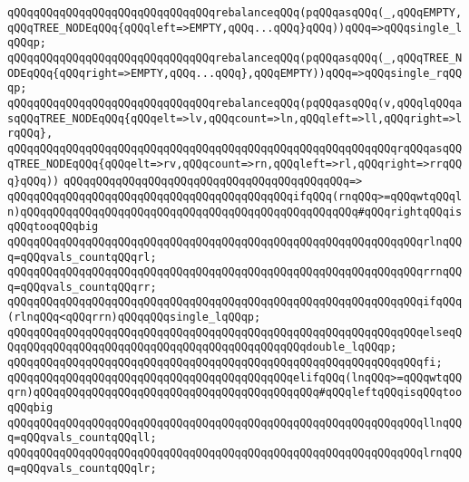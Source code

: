 \newline
\verb|qQQqqQQqqQQqqQQqqQQqqQQqqQQqqQQqrebalanceqQQq(pqQQqasqQQq(_,qQQqEMPTY,qQQqTREE_NODEqQQq{qQQqleft=>EMPTY,qQQq...qQQq}qQQq))qQQq=>qQQqsingle_lqQQqp;|\newline
\verb|qQQqqQQqqQQqqQQqqQQqqQQqqQQqqQQqrebalanceqQQq(pqQQqasqQQq(_,qQQqTREE_NODEqQQq{qQQqright=>EMPTY,qQQq...qQQq},qQQqEMPTY))qQQq=>qQQqsingle_rqQQqp;|\newline
\newline
\verb|qQQqqQQqqQQqqQQqqQQqqQQqqQQqqQQqrebalanceqQQq(pqQQqasqQQq(v,qQQqlqQQqasqQQqTREE_NODEqQQq{qQQqelt=>lv,qQQqcount=>ln,qQQqleft=>ll,qQQqright=>lrqQQq},|\newline
\verb|qQQqqQQqqQQqqQQqqQQqqQQqqQQqqQQqqQQqqQQqqQQqqQQqqQQqqQQqqQQqrqQQqasqQQqTREE_NODEqQQq{qQQqelt=>rv,qQQqcount=>rn,qQQqleft=>rl,qQQqright=>rrqQQq}qQQq))|\newline
\verb|qQQqqQQqqQQqqQQqqQQqqQQqqQQqqQQqqQQqqQQqqQQq=>|\newline
\verb|qQQqqQQqqQQqqQQqqQQqqQQqqQQqqQQqqQQqqQQqqQQqifqQQq(rnqQQq>=qQQqwtqQQqln)qQQqqQQqqQQqqQQqqQQqqQQqqQQqqQQqqQQqqQQqqQQqqQQqqQQq#qQQqrightqQQqisqQQqtooqQQqbig|\newline
\newline
\verb|qQQqqQQqqQQqqQQqqQQqqQQqqQQqqQQqqQQqqQQqqQQqqQQqqQQqqQQqqQQqqQQqrlnqQQq=qQQqvals_countqQQqrl;|\newline
\verb|qQQqqQQqqQQqqQQqqQQqqQQqqQQqqQQqqQQqqQQqqQQqqQQqqQQqqQQqqQQqqQQqrrnqQQq=qQQqvals_countqQQqrr;|\newline
\newline
\verb|qQQqqQQqqQQqqQQqqQQqqQQqqQQqqQQqqQQqqQQqqQQqqQQqqQQqqQQqqQQqqQQqifqQQq(rlnqQQq<qQQqrrn)qQQqqQQqsingle_lqQQqp;|\newline
\verb|qQQqqQQqqQQqqQQqqQQqqQQqqQQqqQQqqQQqqQQqqQQqqQQqqQQqqQQqqQQqqQQqelseqQQqqQQqqQQqqQQqqQQqqQQqqQQqqQQqqQQqqQQqqQQqqQQqdouble_lqQQqp;|\newline
\verb|qQQqqQQqqQQqqQQqqQQqqQQqqQQqqQQqqQQqqQQqqQQqqQQqqQQqqQQqqQQqqQQqfi;|\newline
\newline
\verb|qQQqqQQqqQQqqQQqqQQqqQQqqQQqqQQqqQQqqQQqqQQqelifqQQq(lnqQQq>=qQQqwtqQQqrn)qQQqqQQqqQQqqQQqqQQqqQQqqQQqqQQqqQQqqQQqqQQq#qQQqleftqQQqisqQQqtooqQQqbig|\newline
\newline
\verb|qQQqqQQqqQQqqQQqqQQqqQQqqQQqqQQqqQQqqQQqqQQqqQQqqQQqqQQqqQQqqQQqllnqQQq=qQQqvals_countqQQqll;|\newline
\verb|qQQqqQQqqQQqqQQqqQQqqQQqqQQqqQQqqQQqqQQqqQQqqQQqqQQqqQQqqQQqqQQqlrnqQQq=qQQqvals_countqQQqlr;|\newline
